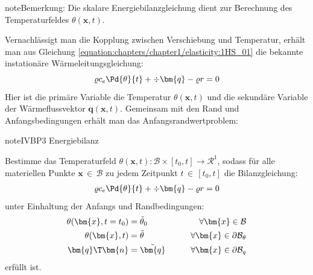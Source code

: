 \documentclass[letterpaper,10pt,german]{jupyterBook}
\begin{document}
\begin{sphinxadmonition}{note}{Bemerkung:}
\sphinxAtStartPar
Die skalare Energiebilanzgleichung dient zur Berechnung des Temperaturfeldes \(\theta(\bm{x},t)\).
\end{sphinxadmonition}

\sphinxAtStartPar
Vernachlässigt man die Kopplung zwischen Verschiebung und Temperatur, erhält man aus Gleichung \eqref{equation:chapters/chapter1/elasticity:1HS_01} die bekannte instationäre Wärmeleitungsgleichung:
\label{equation:chapters/chapter1/elasticity:05788a6b-2d1e-46cd-a658-a2648658a015}\begin{equation}
\varrho c_e \Pd{\theta}{t} + \div{\bm{q}} - \varrho r = 0
\end{equation}
\sphinxAtStartPar
Hier ist die primäre Variable die Temperatur \(\theta(\bm{x},t)\) und die sekundäre Variable der Wärmeflussvektor \(\bm{q}(\bm{x},t)\). Gemeinsam mit den Rand\sphinxhyphen{} und Anfangsbedingungen erhält man das Anfangsrandwertproblem:

\begin{sphinxadmonition}{note}{IVBP3 \sphinxhyphen{} Energiebilanz}

\sphinxAtStartPar
Bestimme das Temperaturfeld \(\theta(\bm{x},t): \mathcal{B} \times [t_0,t] \rightarrow \mathcal{R}^1\), sodass für alle materiellen Punkte \(\bm{x} \, \in \, \mathcal{B}\) zu jedem Zeitpunkt \(t \, \in \, [t_0,t]\) die Bilanzgleichung:
\begin{equation*}
\begin{split}
\varrho c_e \Pd{\theta}{t} + \div{\bm{q}} - \varrho r = 0
\end{split}
\end{equation*}
\sphinxAtStartPar
unter Einhaltung der Anfangs\sphinxhyphen{} und Randbedingungen:
\begin{equation*}
\begin{split}
\theta(\bm{x},t=t_0) & = \tilde{\theta}_0 \qquad &\forall \bm{x} \in \mathcal{B}& \\
\theta(\bm{x},t) & = \tilde{\theta} \qquad &\forall \bm{x} \in \partial \mathcal{B}_{\theta}& \\
\bm{q}\T \bm{n} & = \tilde{\bm{q}} \qquad &\forall \bm{x} \in \partial\mathcal{B}_q&
\end{split}
\end{equation*}
\sphinxAtStartPar
erfüllt ist.
\end{sphinxadmonition}
\end{document}
